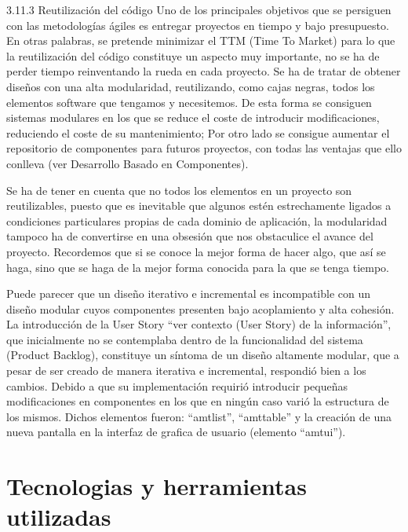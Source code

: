 3.11.3 Reutilización del código 
Uno  de  los  principales  objetivos  que  se  persiguen  con  las  metodologías  ágiles  es  entregar 
proyectos  en  tiempo  y  bajo  presupuesto.  En  otras  palabras,  se  pretende  minimizar  el  TTM 
(Time To Market) para lo que la reutilización del código constituye un aspecto muy importante, 
no  se  ha  de  perder  tiempo  reinventando  la  rueda  en  cada  proyecto.    Se  ha  de  tratar  de 
obtener  diseños  con  una  alta  modularidad,  reutilizando,  como  cajas  negras,  todos  los 
elementos  software  que  tengamos  y  necesitemos.  De  esta  forma  se  consiguen  sistemas  
modulares en los que se reduce el coste de introducir modificaciones, reduciendo el coste de 
su  mantenimiento;  Por  otro  lado  se  consigue  aumentar  el  repositorio  de  componentes  para 
futuros  proyectos,  con  todas  las  ventajas  que  ello  conlleva  (ver  Desarrollo  Basado  en 
Componentes). 

Se ha de tener en cuenta que no todos los elementos en un proyecto son reutilizables, puesto 
que es inevitable que algunos estén estrechamente ligados a condiciones particulares propias 
de cada dominio de aplicación, la modularidad tampoco ha de convertirse en una obsesión que 
nos obstaculice el avance del proyecto. Recordemos que si se conoce la mejor forma de hacer 
algo,  que  así  se  haga,  sino  que  se  haga  de  la  mejor  forma  conocida  para  la  que  se  tenga 
tiempo. 
  
Puede parecer que un diseño iterativo e incremental es incompatible con un diseño modular 
cuyos  componentes presenten bajo acoplamiento y alta cohesión. La introducción de la User 
Story  “ver  contexto  (User  Story)  de  la  información”,  que  inicialmente  no  se  contemplaba 
dentro de la funcionalidad del sistema (Product Backlog), constituye un síntoma de un diseño 
altamente modular, que a pesar de ser creado de  manera iterativa e incremental, respondió 
bien  a  los  cambios.  Debido  a  que  su  implementación  requirió  introducir  pequeñas 
modificaciones en componentes en los que en ningún caso varió la estructura de los mismos. 
Dichos  elementos  fueron:  “amtlist”,  “amttable”  y  la  creación  de  una  nueva  pantalla  en  la 
interfaz de grafica de usuario (elemento “amtui”). 




\section{Tecnologias y herramientas utilizadas}

